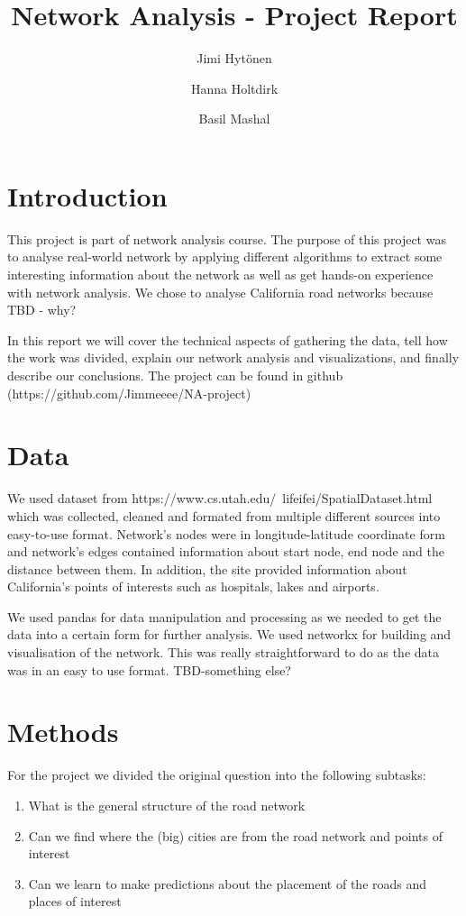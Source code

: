 \documentclass[11pt]{article}
\title{Network Analysis - Project Report}
\author{
    Jimi Hytönen\\
    \and Hanna Holtdirk\\
    \and Basil Mashal
}
\begin{document}
\maketitle

\section{Introduction}
This project is part of network analysis course. The purpose of this project was to analyse real-world network by applying different algorithms to extract some interesting information about the network as well as get hands-on experience with network analysis. We chose to analyse California road networks because TBD - why? 


In this report we will cover the technical aspects of gathering the data, tell how the work was divided, explain our network analysis and visualizations, and finally describe our conclusions. The project can be found in github (https://github.com/Jimmeeee/NA-project)



\section{Data}

We used dataset from https://www.cs.utah.edu/~lifeifei/SpatialDataset.html which was collected, cleaned and formated from multiple different sources into easy-to-use format. Network's nodes were in longitude-latitude coordinate form and network's edges contained information about start node, end node and the distance between them. In addition, the site provided information about California's points of interests such as hospitals, lakes and airports.

We used pandas for data manipulation and processing as we needed to get the data into a certain form for further analysis. We used networkx for building and visualisation of the network. This was really straightforward to do as the data was in an easy to use format.  TBD-something else?

\newpage

\section{Methods}
For the project we divided the original question into the following subtasks: 
\begin{enumerate}
\item What is the general structure of the road network
\item Can we find where the (big) cities are from the road network and points of interest
\item Can we learn to make predictions about the placement of the roads and places of interest
\end{enumerate}
\end{document}
